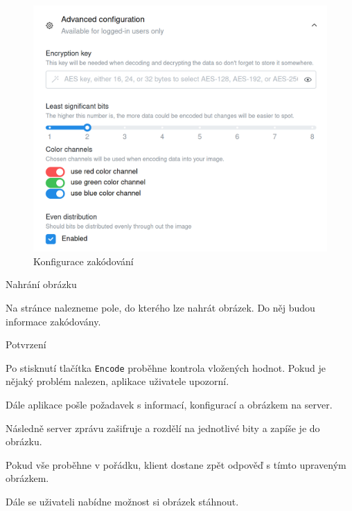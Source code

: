 \begin{figure}
    \centering
    \includegraphics[scale=0.5]{assets/images/encode-configuration}
    \caption{Konfigurace zakódování}\label{fig:konfigurace-zakodovani}
\end{figure}

\begin{subsubsection}{Nahrání obrázku}\label{subsubsec:enc-nahrani-obrazku}

Na stránce nalezneme pole, do kterého lze nahrát obrázek.
Do něj budou informace zakódovány.

\end{subsubsection}

\begin{subsubsection}{Potvrzení}\label{subsubsec:enc-potvrzeni}

Po stisknutí tlačítka \texttt{Encode} proběhne kontrola vložených hodnot.
Pokud je nějaký problém nalezen, aplikace uživatele upozorní.

Dále aplikace pošle požadavek s informací, konfigurací a
obrázkem na server.

Následně server zprávu zašifruje a rozdělí na jednotlivé bity a zapíše je do
obrázku.

Pokud vše proběhne v pořádku, klient dostane zpět odpověď s tímto upraveným
obrázkem.

Dále se uživateli nabídne možnost si obrázek stáhnout.

\end{subsubsection}


